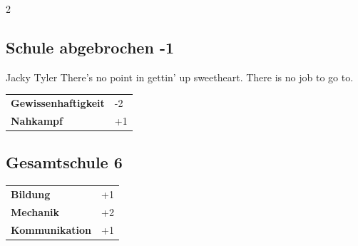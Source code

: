 \begin{multicols}{2}
\begin{tcolorbox}

\end{tcolorbox}

\begin{tcolorbox}
    \subsection*{Schule abgebrochen \hfill \small{-1 }}
    \tcblower


\begin{pquote}{Jacky Tyler}
There's no point in gettin' up sweetheart. There is no job to go to.
\end{pquote}

\vspace{3mm}

\begin{tabular}{@{}ll@{}}
    \textbf{Gewissenhaftigkeit} & -2\\
    \textbf{Nahkampf} & +1\\
\end{tabular}


\end{tcolorbox}

\begin{tcolorbox}
    \subsection*{Gesamtschule \hfill \small{6 }}
    \tcblower




\begin{tabular}{@{}ll@{}}
    \textbf{Bildung} & +1\\
    \textbf{Mechanik} & +2\\
    \textbf{Kommunikation} & +1\\
\end{tabular}


\end{tcolorbox}
\end{multicols}

